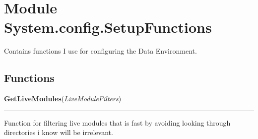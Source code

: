 %
%
%


\section{Module System.config.SetupFunctions}

    \label{System:config:SetupFunctions}
Contains functions I use for configuring the  Data Environment.



  \subsection{Functions}

    \label{System:config:SetupFunctions:GetLiveModules}

    \vspace{0.5ex}

\hspace{.8\funcindent}\begin{boxedminipage}{\funcwidth}

    \raggedright \textbf{GetLiveModules}(\textit{LiveModuleFilters})

    \vspace{-1.5ex}

    \rule{\textwidth}{0.5\fboxrule}
\setlength{\parskip}{2ex}
    Function for filtering live modules that is fast by avoiding looking 
    through directories i know will be irrelevant.

\setlength{\parskip}{1ex}
    \end{boxedminipage}

    \label{System:config:SetupFunctions:GetSVNFiles}

